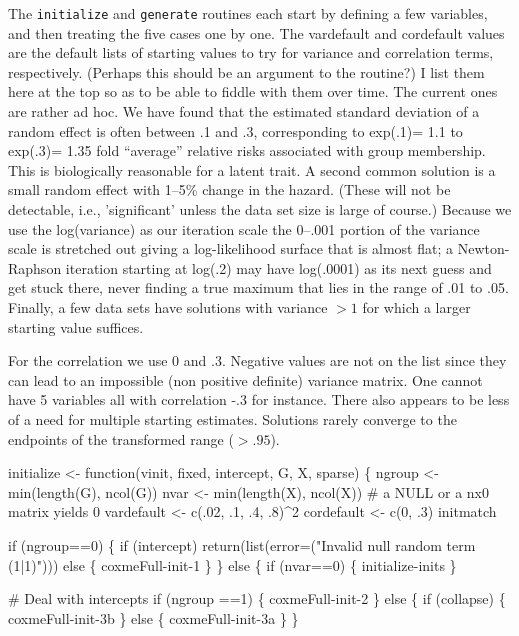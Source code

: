 \documentclass{article}
\begin{document}
The {\tt{}initialize} and {\tt{}generate} routines each start by
defining a few variables, and then treating the five cases one by one.
The vardefault and cordefault values are the default lists of starting values
to try for variance and correlation terms, respectively.  (Perhaps this should
be an argument to the routine?)  I list them here at the top so as to be able
to fiddle with them over time.
The current ones are rather ad hoc. We have found that the estimated standard
deviation of a random effect is often between .1 and .3, corresponding to
exp(.1)= 1.1 to exp(.3)= 1.35 fold ``average'' relative risks associated with
group membership.  This is  biologically reasonable for a latent trait.
A second common solution is a small random effect with 1--5\% change in the hazard.  
(These will not be detectable, i.e., 'significant' unless the data set size is
large of course.)
Because we use the log(variance) as our iteration scale the 0--.001 portion of the
variance scale is stretched out giving a log-likelihood surface that is almost
flat; a Newton-Raphson iteration starting at log(.2) may have log(.0001) as its
next guess and get stuck there, never finding a true maximum that lies in the
range of .01 to .05. 
Finally, a few data sets have solutions with variance $>1$ for which a larger
starting value suffices.

For the correlation we use 0 and .3.  Negative values are not on the list since
they can lead to an impossible (non positive definite) variance matrix.
One cannot have 5 variables all with correlation -.3 for instance.  
There also appears to be less of a need for multiple starting estimates.  Solutions
rarely converge to the endpoints of the transformed range ($> .95$).

\nwenddocs{}\endmoddef
initialize <- function(vinit, fixed, intercept, G, X,  sparse) \{
    ngroup <- min(length(G), ncol(G))
    nvar   <- min(length(X), ncol(X))  # a NULL or a nx0 matrix yields 0
    vardefault <- c(.02, .1, .4, .8)^2
    cordefault <- c(0, .3)
    \LA{}initmatch\RA{}
    
    if (ngroup==0) \{
        if (intercept)
            return(list(error=("Invalid null random term (1|1)")))
        else \{
            \LA{}coxmeFull-init-1\RA{}
            \}
        \}
    else \{
        if (nvar==0) \{
            \LA{}initialize-inits\RA{}
            \}

        # Deal with intercepts
        if (ngroup ==1) \{
            \LA{}coxmeFull-init-2\RA{}
                \}
        else \{
            if (collapse) \{
                \LA{}coxmeFull-init-3b\RA{}
                \}
            else \{
                \LA{}coxmeFull-init-3a\RA{}
                \}
            \}
\end{document}
